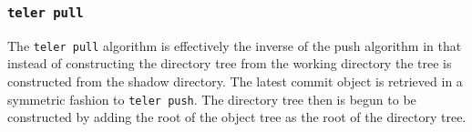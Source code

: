 \documentclass[12pt, letterpaper]{article}
\begin{document}
\begin{multicols}{2}
\begin{center}
\begin{minipage}{.2\textwidth}
\begin{tikzpicture}[scale=0.85]
      \end{tikzpicture}
    \end{minipage}
    \begin{minipage}{.25\textwidth}
    \end{minipage}
  \end{center}


  \subsubsection{\texttt{teler pull}}
  \label{subsubsec:pull}
  The \texttt{teler pull} algorithm is effectively the inverse of the
  push algorithm in that instead of constructing the directory tree
  from the working directory the tree is constructed from the shadow
  directory. The latest commit object is retrieved in a symmetric
  fashion to \texttt{teler push}. The directory tree then is begun to
  be constructed by adding the root of the object tree as the root of
  the directory tree.


\end{multicols}
\end{document}
